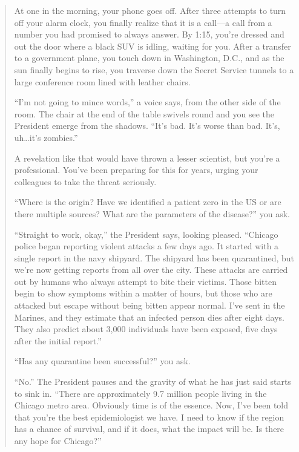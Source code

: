 	\begin{quote}
	At one in the morning, your phone goes off.  After three attempts to 
	turn off your alarm clock, you finally realize that it is a call---a call from a 
	number you had promised to always answer.  By 1:15, you're dressed and out the door where 
	a black SUV is idling, waiting for you.  After a transfer to a government plane, you 
	touch down in Washington, D.C., and as the sun finally begins to rise, you traverse 
	down the Secret Service tunnels to a large conference room lined with leather chairs.

	``I'm not going to mince words,'' a voice says, from the other side of the room.  The 
	chair at the end of the table swivels round and you see the President emerge 
	from the shadows.  ``It's bad.  It's worse than bad.  It's, uh\ldots it's zombies.''

	A revelation like that would have thrown a lesser scientist, but you're a professional.  
	You've been preparing for this for years, urging your colleagues to take the threat seriously.  

	``Where is the origin?  Have we identified a patient zero in the US or are there multiple sources?  
	What are the parameters of the disease\mbox{?}'' you ask.

	``Straight to work, okay,'' the President says, looking pleased. ``Chicago police began reporting violent attacks a few days ago.  It started with a single report in the navy shipyard.  The shipyard has been quarantined, but we're now getting reports from all over the city. These attacks are carried out by humans who always attempt to bite their victims.  Those bitten begin to show symptoms within a matter of hours, but those who are attacked but escape without being bitten appear normal. I've sent in the Marines, and they estimate that an infected person dies after eight days. They also predict about 3,000 individuals have been exposed, five days 	after the initial report.''

	``Has any quarantine been successful\mbox{?}'' you ask.

	``No.''  The President pauses and the gravity of what he has just said starts to sink in.  
	``There are approximately 9.7 million people living in the Chicago metro area.  Obviously 
	time is of the essence.  Now, I've been told that you're the best epidemiologist we have.  
	I need to know if the region has a chance of survival, and if it does, what the impact will be.
	Is there any hope for Chicago?''
	\end{quote}


